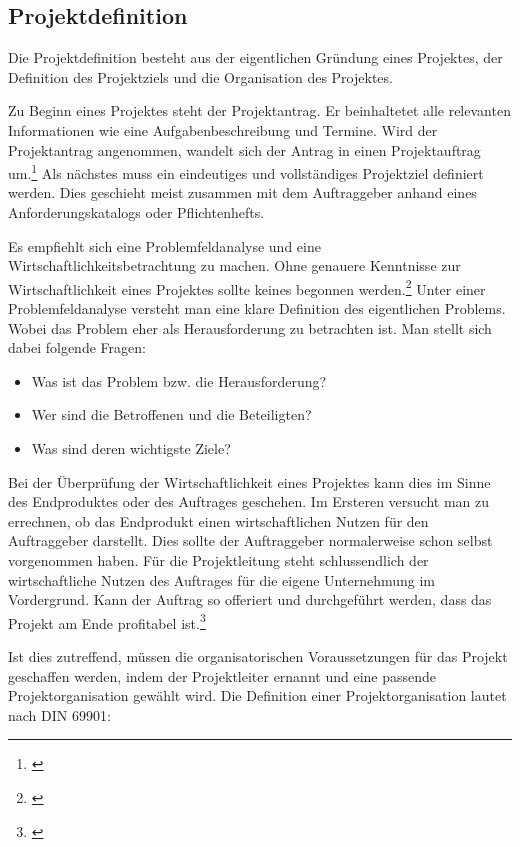 \subsection{Projektdefinition}
Die Projektdefinition besteht aus der eigentlichen Gründung eines Projektes,
der Definition des Projektziels und die Organisation des Projektes.

Zu Beginn eines Projektes steht der Projektantrag. Er beinhaltetet alle relevanten
Informationen wie eine Aufgabenbeschreibung und Termine. Wird der Projektantrag
angenommen, wandelt sich der Antrag in einen Projektauftrag um.\footnote{\citealp*[Vgl.][S. 13]{burghardt2007einfuehrung}}
Als nächstes muss ein eindeutiges und vollständiges Projektziel definiert werden.
Dies geschieht meist zusammen mit dem Auftraggeber anhand eines Anforderungskatalogs
oder Pflichtenhefts.

Es empfiehlt sich eine Problemfeldanalyse und eine Wirtschaftlichkeitsbetrachtung
zu machen. Ohne genauere Kenntnisse zur Wirtschaftlichkeit eines Projektes sollte
keines begonnen werden.\footnote{\citealp*[Vgl.][S. 45]{burghardt2007einfuehrung}}
Unter einer Problemfeldanalyse versteht man eine klare Definition des eigentlichen
Problems. Wobei das Problem eher als Herausforderung zu betrachten ist. Man
stellt sich dabei folgende Fragen:

\begin{itemize}
    \item Was ist das Problem bzw. die Herausforderung?
    \item Wer sind die Betroffenen und die Beteiligten?
    \item Was sind deren wichtigste Ziele?
\end{itemize}

Bei der Überprüfung der Wirtschaftlichkeit eines Projektes kann dies im Sinne
des Endproduktes oder des Auftrages geschehen. Im Ersteren versucht man zu
errechnen, ob das Endprodukt einen wirtschaftlichen Nutzen für den Auftraggeber
darstellt. Dies sollte der Auftraggeber normalerweise schon selbst vorgenommen
haben. Für die Projektleitung steht schlussendlich der wirtschaftliche Nutzen
des Auftrages für die eigene Unternehmung im Vordergrund. Kann der Auftrag so
offeriert und durchgeführt werden, dass das Projekt am Ende profitabel ist.\footnote{\citealp*[Vgl.][S. 4]{prueter2007multi}}

Ist dies zutreffend, müssen die organisatorischen Voraussetzungen für das Projekt geschaffen werden,
indem der Projektleiter ernannt und eine passende Projektorganisation gewählt wird.
Die Definition einer Projektorganisation lautet nach DIN 69901:

